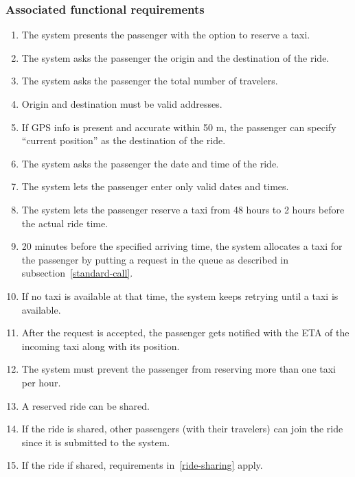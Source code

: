 \subsubsection{Associated functional requirements}
\begin{enumerate}
	\item The system presents the passenger with the option to reserve a taxi.
	\item The system asks the passenger the origin and the destination of the ride.
	\item The system asks the passenger the total number of travelers.
	\item Origin and destination must be valid addresses.
	\item If GPS info is present and accurate within 50 m, the passenger can specify ``current position'' as the destination of the ride.
	\item The system asks the passenger the date and time of the ride.
	\item The system lets the passenger enter only valid dates and times.
	\item The system lets the passenger reserve a taxi from 48 hours to 2 hours before the actual ride time.
	\item 20 minutes before the specified arriving time, the system allocates a taxi for the passenger by putting a request in the queue as described in subsection~\ref{standard-call}.
	\item If no taxi is available at that time, the system keeps retrying until a taxi is available.
	\item After the request is accepted, the passenger gets notified with the ETA of the incoming taxi along with its position.
	\item The system must prevent the passenger from reserving more than one taxi per hour.
	\item A reserved ride can be shared.
	\item If the ride is shared, other passengers (with their travelers) can join the ride since it is submitted to the system.
	\item If the ride if shared, requirements in~\autoref{ride-sharing} apply.
\end{enumerate}
